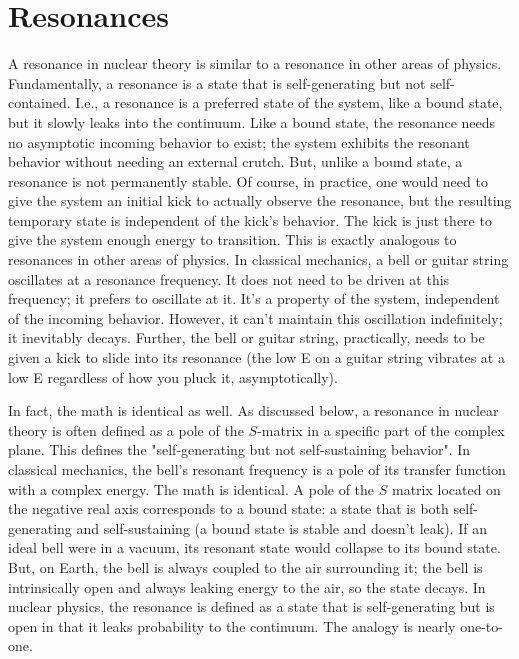 \section{Resonances}
A resonance in nuclear theory is similar to a resonance in other areas of physics. Fundamentally, a resonance is a state that is self-generating but not self-contained. I.e., a resonance is a preferred state of the system, like a bound state, but it slowly leaks into the continuum. Like a bound state, the resonance needs no asymptotic incoming behavior to exist; the system exhibits the resonant behavior without needing an external crutch. But, unlike a bound state, a resonance is not permanently stable. Of course, in practice, one would need to give the system an initial kick to actually observe the resonance, but the resulting temporary state is independent of the kick's behavior. The kick is just there to give the system enough energy to transition. This is exactly analogous to resonances in other areas of physics. In classical mechanics, a bell or guitar string oscillates at a resonance frequency. It does not need to be driven at this frequency; it prefers to oscillate at it. It's a property of the system, independent of the incoming behavior. However, it can't maintain this oscillation indefinitely; it inevitably decays. Further, the bell or guitar string, practically, needs to be given a kick to slide into its resonance (the low E on a guitar string vibrates at a low E regardless of how you pluck it, asymptotically).

In fact, the math is identical as well. As discussed below, a resonance in nuclear theory is often defined as a pole of the $S$-matrix in a specific part of the complex plane. This defines the "self-generating but not self-sustaining behavior". In classical mechanics, the bell's resonant frequency is a pole of its transfer function with a complex energy. The math is identical. A pole of the $S$ matrix located on the negative real axis corresponds to a bound state: a state that is both self-generating and self-sustaining (a bound state is stable and doesn't leak). If an ideal bell were in a vacuum, its resonant state would collapse to its bound state. But, on Earth, the bell is always coupled to the air surrounding it; the bell is intrinsically open and always leaking energy to the air, so the state decays. In nuclear physics, the resonance is defined as a state that is self-generating but is open in that it leaks probability to the continuum. The analogy is nearly one-to-one.

